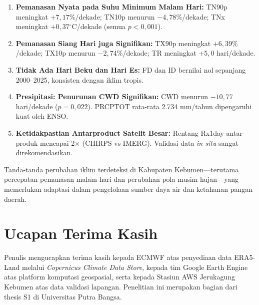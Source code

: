 \documentclass[12pt, a4paper]{article}
\newcommand{\degC}{$^{\circ}$C}
\begin{document}
\begin{enumerate}
  \item \textbf{Pemanasan Nyata pada Suhu Minimum Malam Hari:}
    TN90p meningkat $+7{,}17\%$/dekade; TN10p menurun $-4{,}78\%$/dekade; TNx meningkat $+0{,}37$\degC{}/dekade (semua $p < 0{,}001$).
  \item \textbf{Pemanasan Siang Hari juga Signifikan:}
    TX90p meningkat $+6{,}39\%$/dekade; TX10p menurun $-2{,}74\%$/dekade; TR meningkat $+5{,}0$ hari/dekade.
  \item \textbf{Tidak Ada Hari Beku dan Hari Es:}
    FD dan ID bernilai nol sepanjang 2000--2025, konsisten dengan iklim tropis.
  \item \textbf{Presipitasi: Penurunan CWD Signifikan:}
    CWD menurun $-10{,}77$ hari/dekade ($p = 0{,}022$). PRCPTOT rata-rata 2.734 mm/tahun dipengaruhi kuat oleh ENSO.
  \item \textbf{Ketidakpastian Antarproduct Satelit Besar:}
    Rentang Rx1day antar-produk mencapai 2$\times$ (CHIRPS vs IMERG). Validasi data \textit{in-situ} sangat direkomendasikan.
\end{enumerate}

Tanda-tanda perubahan iklim terdeteksi di Kabupaten Kebumen---terutama percepatan pemanasan malam hari dan perubahan pola musim hujan---yang memerlukan adaptasi dalam pengelolaan sumber daya air dan ketahanan pangan daerah.

\section*{Ucapan Terima Kasih}

Penulis mengucapkan terima kasih kepada ECMWF atas penyediaan data ERA5-Land melalui \textit{Copernicus Climate Data Store}, kepada tim Google Earth Engine atas platform komputasi geospasial, serta kepada Stasiun AWS Jerukagung Kebumen atas data validasi lapangan. Penelitian ini merupakan bagian dari thesis S1 di Universitas Putra Bangsa.

\newpage

\end{document}

